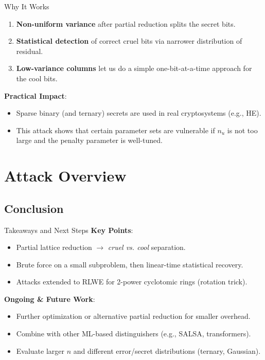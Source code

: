\documentclass{beamer}
\begin{document}
\begin{frame}{Why It Works}
  \begin{enumerate}
    \item \textbf{Non-uniform variance} after partial reduction splits the secret bits.
    \item \textbf{Statistical detection} of correct cruel bits via narrower distribution of residual.
    \item \textbf{Low-variance columns} let us do a simple one-bit-at-a-time approach for the cool bits.
  \end{enumerate}

  \vspace{0.3cm}
  \textbf{Practical Impact}:
  \begin{itemize}
    \item Sparse binary (and ternary) secrets are used in real cryptosystems (e.g., HE).
    \item This attack shows that certain parameter sets are vulnerable if $n_u$ is not too large and the penalty parameter is well-tuned.
  \end{itemize}
\end{frame}

\section{Attack Overview}
\subsection*{Conclusion}
\begin{frame}{Takeaways and Next Steps}
  \textbf{Key Points}:
  \begin{itemize}
    \item Partial lattice reduction $\rightarrow$ \textit{cruel vs. cool} separation.
    \item Brute force on a small subproblem, then linear-time statistical recovery.
    \item Attacks extended to RLWE for 2-power cyclotomic rings (rotation trick).
  \end{itemize}

  \vspace{0.3cm}
  \textbf{Ongoing \& Future Work}:
  \begin{itemize}
    \item Further optimization or alternative partial reduction for smaller overhead.
    \item Combine with other ML-based distinguishers (e.g., SALSA, transformers).
    \item Evaluate larger $n$ and different error/secret distributions (ternary, Gaussian).
  \end{itemize}
\end{frame}
\end{document}
